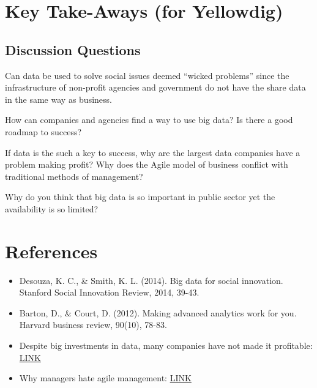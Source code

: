 \documentclass[]{book}
\providecommand{\tightlist}{%
  \setlength{\itemsep}{0pt}\setlength{\parskip}{0pt}}
\begin{document}
\hypertarget{key-take-aways-for-yellowdig-2}{%
\section{Key Take-Aways (for Yellowdig)}\label{key-take-aways-for-yellowdig-2}}

\hypertarget{discussion-questions-2}{%
\subsection{Discussion Questions}\label{discussion-questions-2}}

Can data be used to solve social issues deemed ``wicked problems'' since the infrastructure of non-profit agencies and government do not have the share data in the same way as business.

How can companies and agencies find a way to use big data? Is there a good roadmap to success?

If data is the such a key to success, why are the largest data companies have a problem making profit?
Why does the Agile model of business conflict with traditional methods of management?

Why do you think that big data is so important in public sector yet the availability is so limited?

\hypertarget{references-2}{%
\section{References}\label{references-2}}

\begin{itemize}
\tightlist
\item
  Desouza, K. C., \& Smith, K. L. (2014). Big data for social innovation. Stanford Social Innovation Review, 2014, 39-43.\\
\item
  Barton, D., \& Court, D. (2012). Making advanced analytics work for you. Harvard business review, 90(10), 78-83.\\
\item
  Despite big investments in data, many companies have not made it profitable: \href{https://www.theregister.co.uk/2017/06/07/go_small_on_big_data/}{LINK}\\
\item
  Why managers hate agile management: \href{https://www.forbes.com/sites/stevedenning/2015/01/28/more-on-why-managers-hate-agile/\#186ce9f010ea}{LINK}
\end{itemize}
\end{document}
